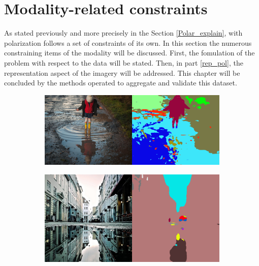 \section{Modality-related constraints}\label{mod_4}

As stated previously and more precisely in the Section \ref{Polar_explain}, with polarization follows a set of constraints of its own.
In this section the numerous constraining items of the modality will be discussed. First, the fomulation of the problem with respect to the data will be stated. Then, in part \ref{rep_pol}, the representation aspect of the imagery will be addressed. This chapter will be concluded by the methods operated to aggregate and validate this dataset.

\begin{figure}[ht]
	\centering
	
	\begin{subfigure}[b]{.8\linewidth}   
		\centering 
		\includegraphics[width=\linewidth]{Figures/Formulation/image_seg_fail.png}
	\end{subfigure}
	
	
	\begin{subfigure}[b]{.8\linewidth}   
		\centering 
		\includegraphics[width=\linewidth]{Figures/Formulation/image_seg_fail2.png}
	\end{subfigure}
	

\end{figure}
